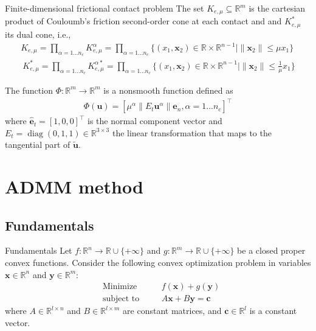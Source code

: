 \documentclass[8pt,red]{beamer}
\theoremstyle{plain}
\theoremstyle{definition}
\theoremstyle{remark}
\newcommand{\MIN}{\mathop{\mathrm{Minimize}}}
\newcommand{\ST}{\mathop{\mathrm{subject~to}}}
\newcommand{\diag}{\mathop{\mathrm{diag}}\nolimits}
\newcommand{\overRe}{\ensuremath{\Re\cup\{+\infty\}}}
\renewcommand{\Re}{\ensuremath{\mathbb{R}}}
\newcommand{\bi}[1]{\ensuremath{\boldsymbol{#1}}}
\begin{document}
\begin{frame}{Finite-dimensional frictional contact problem}
The set $K_{e,\mu} \subseteq \Re^{m}$ is the cartesian product of Couloumb's friction second-order cone at each contact and and $K_{e,\mu}^{*}$ its dual cone, i.e.,
\begin{align}
	K_{e,\mu} = \prod_{\alpha = 1...n_{c}} K_{e,\mu}^{\alpha} =
	\prod_{\alpha = 1...n_{c}} \{ (x_{1},\bi{x}_{2}) \in \Re \times \Re^{n-1} \mid \| \bi{x}_{2} \| \le \mu x_{1} \} \\
	\ K_{e,\mu}^{*} = \prod_{\alpha = 1...n_{c}} K_{e,\mu}^{\alpha *} =
	\prod_{\alpha = 1...n_{c}} \{ (x_{1},\bi{x}_{2}) \in \Re \times \Re^{n-1}
  \mid \| \bi{x}_{2} \| \le \frac{1}{\mu} x_{1} \} 
\end{align}

The function $\Phi: \Re^{m} \rightarrow \Re^{m}$ is a nonsmooth function defined as
\begin{align}
	\Phi(\bi{u}) = [\mu^{\alpha} \| E_{t} \bi{u}^{\alpha} \| \hat{\bi{e}}_{n}, \alpha = 1...n_{c}]^{\top}
\end{align}
where $\hat{\bi{e}}_{t} = [1, 0, 0]^{\top}$ is the normal component vector and $E_{t} = \diag (0,1,1) \in \Re^{3 \times 3}$ the linear transformation that maps to the tangential part of $\tilde{\bi{u}}$.
\end{frame}

\section{ADMM method}

\subsection{Fundamentals}

\begin{frame}{Fundamentals}
Let $f : \Re^{n} \to \overRe$ and 
$g : \Re^{m} \to \overRe$ be a closed proper convex 
functions. 
Consider the following convex optimization problem in variables 
$\bi{x} \in \Re^{n}$ and $\bi{y} \in \Re^{m}$: 
\begin{subequations}\label{P.convex.1}%
  \begin{alignat}{3}
    & \MIN  &{\quad}& 
    f(\bi{x}) + g(\bi{y}) \\
    & \ST && 
    A \bi{x} + B \bi{y} = \bi{c}  
  \end{alignat}
\end{subequations}
where $A \in \Re^{l \times n}$ and $B \in \Re^{l \times m}$ are constant 
matrices, and $\bi{c} \in \Re^{l}$ is a constant vector.
\end{frame}
\end{document}
